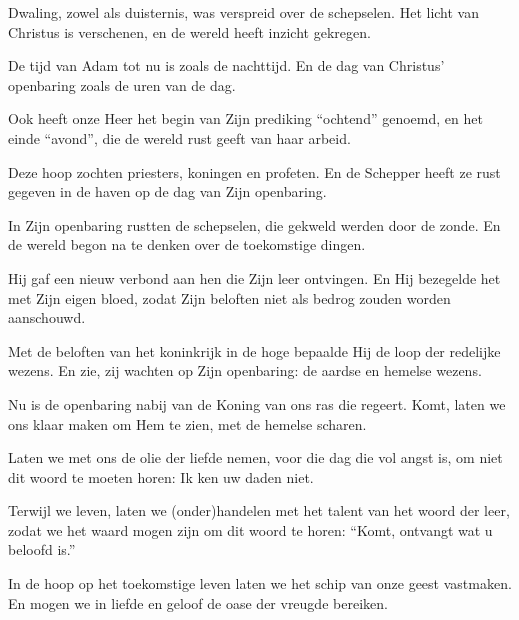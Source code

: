 \documentclass[12pt,twoside,a5paper]{article}
\begin{document}

\begin{halfparskip}
  Dwaling, zowel als duisternis, was verspreid over de schepselen. Het licht van Christus is verschenen, en de wereld heeft inzicht gekregen.

  De tijd van Adam tot nu is zoals de nachttijd. En de dag van Christus' openbaring zoals de uren van de dag.

  Ook heeft onze Heer het begin van Zijn prediking ``ochtend'' genoemd, en het einde ``avond'', die de wereld rust geeft van haar arbeid.

  Deze hoop zochten priesters, koningen en profeten. En de Schepper heeft ze rust gegeven in de haven op de dag van Zijn openbaring.

  In Zijn openbaring rustten de schepselen, die gekweld werden door de zonde. En de wereld begon na te denken over de toekomstige dingen.

  Hij gaf een nieuw verbond aan hen die Zijn leer ontvingen. En Hij bezegelde het met Zijn eigen bloed, zodat Zijn beloften niet als bedrog zouden worden aanschouwd.

  Met de beloften van het koninkrijk in de hoge bepaalde Hij de loop der redelijke wezens. En zie, zij wachten op Zijn openbaring: de aardse en hemelse wezens.

  Nu is de openbaring nabij van de Koning van ons ras die regeert. Komt, laten we ons klaar maken om Hem te zien, met de hemelse scharen.

  Laten we met ons de olie der liefde nemen, voor die dag die vol angst is, om niet dit woord te moeten horen: Ik ken uw daden niet.

  Terwijl we leven, laten we (onder)handelen met het talent van het woord der leer, zodat we het waard mogen zijn om dit woord te horen: ``Komt, ontvangt wat u beloofd is.''

  In de hoop op het toekomstige leven laten we het schip van onze geest vastmaken. En mogen we in liefde en geloof de oase der vreugde bereiken.
\end{halfparskip}
\end{document}
